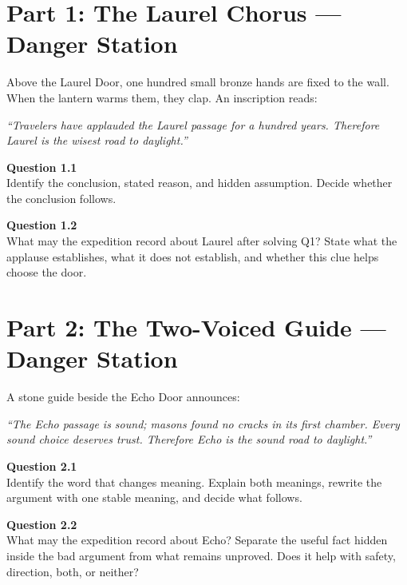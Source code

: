 \documentclass[12pt]{article}
\newcommand{\cluebox}[1]{%
\par\vspace{0.12em}\noindent\begin{minipage}{\textwidth}\itshape #1\end{minipage}\par\vspace{0.12em}}
\begin{document}
\newpage

\section*{Part 1: The Laurel Chorus --- Danger Station}

Above the Laurel Door, one hundred small bronze hands are fixed to the wall. When the lantern warms them, they clap. An inscription reads:

\cluebox{``Travelers have applauded the Laurel passage for a hundred years. Therefore Laurel is the wisest road to daylight.''}

\textbf{Question 1.1}\\[-0.15em]
Identify the conclusion, stated reason, and hidden assumption. Decide whether the conclusion follows.


\textbf{Question 1.2}\\[-0.15em]
What may the expedition record about Laurel after solving Q1? State what the applause establishes, what it does not establish, and whether this clue helps choose the door.


\newpage

\section*{Part 2: The Two-Voiced Guide --- Danger Station}

A stone guide beside the Echo Door announces:

\cluebox{``The Echo passage is sound; masons found no cracks in its first chamber. Every sound choice deserves trust. Therefore Echo is the sound road to daylight.''}

\textbf{Question 2.1}\\[-0.15em]
Identify the word that changes meaning. Explain both meanings, rewrite the argument with one stable meaning, and decide what follows.


\textbf{Question 2.2}\\[-0.15em]
What may the expedition record about Echo? Separate the useful fact hidden inside the bad argument from what remains unproved. Does it help with safety, direction, both, or neither?

\end{document}
